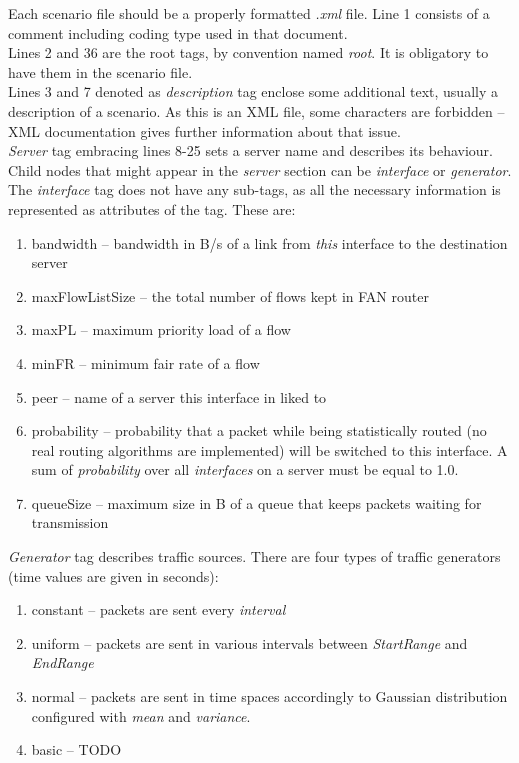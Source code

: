 \documentclass[a4paper,12pt]{article}
\begin{document}
	Each scenario file should be a properly formatted \emph{.xml} file. Line 1
	consists of a comment including coding type used in that document.\\
	Lines 2 and 36 are the root tags, by convention named \emph{root}. It is
	obligatory to have them in the scenario file.\\
	Lines 3 and 7 denoted as \emph{description} tag enclose some
	additional text, usually a description of a scenario. As this is an XML file,
	some characters are forbidden -- XML documentation gives further
	information about that issue.\\
	\emph{Server} tag embracing lines 8-25 sets a server name and describes its
	behaviour. Child nodes that might appear in the \emph{server} section can be
	\emph{interface} or \emph{generator}.\\
	The \emph{interface} tag does not have any sub-tags, as all the necessary
	information is represented as attributes of the tag. These are:
	\begin{enumerate}
      \item bandwidth -- bandwidth in B/s of a link from \emph{this} interface
      to the destination server
      \item maxFlowListSize -- the total number of flows kept in FAN router
      \item maxPL -- maximum priority load of a flow
      \item minFR -- minimum fair rate of a flow
      \item peer -- name of a server this interface in liked to
      \item probability -- probability that a packet while being
      statistically routed (no real routing algorithms are implemented) will
      be switched to this interface. A sum of \emph{probability} over all
      \emph{interfaces} on a server must be equal to 1.0.
      \item queueSize -- maximum size in B of a queue that keeps packets
      waiting for transmission
    \end{enumerate}
    \emph{Generator} tag describes traffic sources. There are four types of
    traffic generators (time values are given in seconds):
    \begin{enumerate}
      \item constant -- packets are sent every \emph{interval} 
      \item uniform -- packets are sent in various intervals between
      \emph{StartRange} and \emph{EndRange}
      \item normal -- packets are sent in time spaces accordingly to Gaussian
      distribution configured with \emph{mean} and \emph{variance}. 
      \item basic -- TODO
    \end{enumerate}
    
\end{document}
